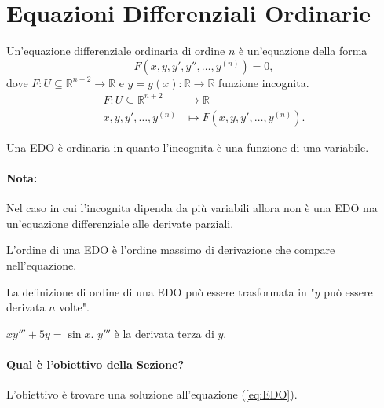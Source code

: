 \section{Equazioni Differenziali Ordinarie}
\begin{definition}
    Un'equazione differenziale ordinaria di ordine $n$ è un'equazione della forma
    \begin{equation}\label{eq:EDO}
        F(x,y,y', y'', \hdots, y^{(n)})=0,
    \end{equation}
    dove $F\colon U\subseteq\mathbb R^{n+2}\rightarrow\mathbb R$ e $y=y(x)\colon\mathbb R\rightarrow\mathbb R$ funzione incognita.
    \begin{align*}
        F\colon U\subseteq\mathbb R^{n+2} & \rightarrow\mathbb R\\
        x,y,y',\hdots, y^{(n)} & \mapsto F(x,y,y', \hdots, y^{(n)}).
    \end{align*}
\end{definition}

\begin{definition}
    Una EDO è ordinaria in quanto l'incognita è una funzione di una variabile.
\end{definition}

\paragraph{Nota:} Nel caso in cui l'incognita dipenda da più variabili allora non è una EDO ma un'equazione differenziale alle derivate parziali.

\begin{definition}
    L'ordine di una EDO è l'ordine massimo di derivazione che compare nell'equazione.
\end{definition}

La definizione di ordine di una EDO può essere trasformata in "$y$ può essere derivata $n$ volte".

\begin{example}
    $xy'''+5y=\sin x$. $y'''$ è la derivata terza di $y$.
\end{example}

\paragraph{Qual è l'obiettivo della Sezione?} L'obiettivo è trovare una soluzione all'equazione (\ref{eq:EDO}).

